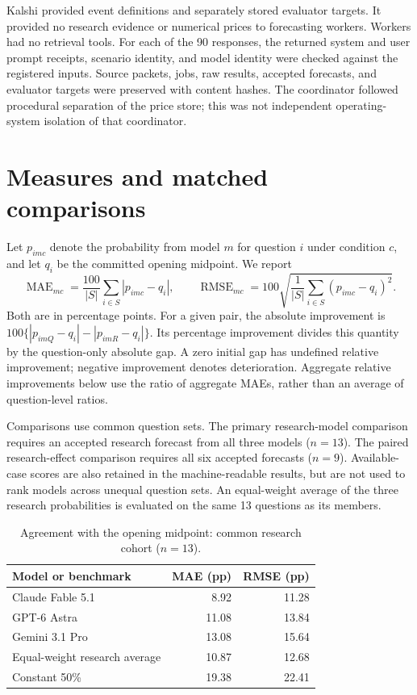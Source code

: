 \documentclass[11pt]{article}
\begin{document}
Kalshi provided event definitions and separately stored evaluator targets. It
provided no research evidence or numerical prices to forecasting workers.
Workers had no retrieval tools. For each of the 90 responses, the returned
system and user prompt receipts, scenario identity, and model identity were
checked against the registered inputs. Source packets, jobs, raw results,
accepted forecasts, and evaluator targets were preserved with content hashes.
The coordinator followed procedural separation of the price store; this was
not independent operating-system isolation of that coordinator.

\section{Measures and matched comparisons}
Let $p_{imc}$ denote the probability from model $m$ for question $i$ under
condition $c$, and let $q_i$ be the committed opening midpoint. We report
\[
 \operatorname{MAE}_{mc}=\frac{100}{|S|}\sum_{i\in S}|p_{imc}-q_i|,
 \qquad
 \operatorname{RMSE}_{mc}=100\sqrt{\frac{1}{|S|}\sum_{i\in S}(p_{imc}-q_i)^2}.
\]
Both are in percentage points. For a given pair, the absolute improvement is
$100\{|p_{imQ}-q_i|-|p_{imR}-q_i|\}$. Its percentage improvement divides this
quantity by the question-only absolute gap. A zero initial gap has undefined
relative improvement; negative improvement denotes deterioration. Aggregate
relative improvements below use the ratio of aggregate MAEs, rather than an
average of question-level ratios.

Comparisons use common question sets. The primary research-model comparison
requires an accepted research forecast from all three models ($n=13$). The
paired research-effect comparison requires all six accepted forecasts ($n=9$).
Available-case scores are also retained in the machine-readable results, but
are not used to rank models across unequal question sets. An equal-weight
average of the three research probabilities is evaluated on the same 13
questions as its members.

\begin{table}[htbp]
\centering
\caption{Agreement with the opening midpoint: common research cohort ($n=13$).}
\begin{tabular}{lrr}
\toprule
Model or benchmark & MAE (pp) & RMSE (pp)\\
\midrule
Claude Fable 5.1 & 8.92 & 11.28\\
GPT-6 Astra & 11.08 & 13.84\\
Gemini 3.1 Pro & 13.08 & 15.64\\
Equal-weight research average & 10.87 & 12.68\\
Constant 50\% & 19.38 & 22.41\\
\bottomrule
\end{tabular}
\end{table}
\end{document}
